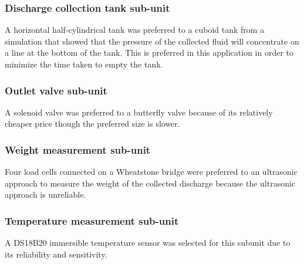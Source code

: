\subsubsection{Discharge collection tank sub-unit}
A horizontal half-cylindrical tank was preferred to a cuboid tank from a simulation that showed that the pressure of the collected fluid will concentrate on a line at the bottom of the tank. This is preferred in this application in order to minimize the time taken to empty the tank.
\subsubsection{Outlet valve sub-unit}
A solenoid valve was preferred to a butterfly valve because of its relatively cheaper price though the preferred size is slower.
\subsubsection{Weight measurement sub-unit}
Four load cells connected on a Wheatstone bridge were preferred to an ultrasonic approach to measure the weight of the collected discharge because the ultrasonic approach is unreliable.
\subsubsection{Temperature measurement sub-unit}
A DS18B20 immersible temperature sensor was selected for this subunit due to its reliability and sensitivity.
\par
